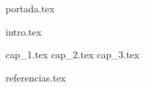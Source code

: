 \documentclass[12pt, a4paper]{article} %
\begin{document}

{portada.tex}

\newpage
{} 
\tableofcontents
\newpage

{intro.tex}
\newpage

{cap_1.tex}
\newpage
{cap_2.tex}
\newpage
{cap_3.tex}
\newpage

{referencias.tex}
\end{document}
